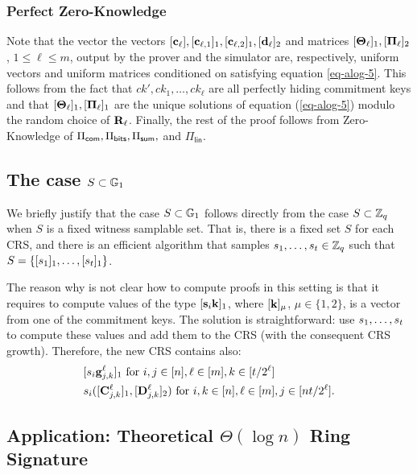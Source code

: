 \subsubsection{Perfect Zero-Knowledge}
Note that the vector the vectors \([\mathbf{c}_\ell],[\mathbf{c}_{\ell,1}]_1,[\mathbf{c}_{\ell,2}]_1,[\mathbf{d}_\ell]_2\) and matrices \([\mathbf{{\Theta}}_\ell]_1,[\mathbf{{\Pi}}_\ell]_2\), \(1\leq\ell\leq m\), output by the prover and the simulator are, respectively, uniform vectors and uniform matrices conditioned on satisfying equation \ref{eq-alog-5}. This follows from the fact that \(ck',ck_1,\ldots,ck_\ell\) are all perfectly hiding commitment keys and that \([\mathbf{{\Theta}}_\ell]_1,[\mathbf{{\Pi}}_\ell]_1\) are the unique solutions of equation (\ref{eq-alog-5}) modulo the random choice of \(\mathbf{{R}}_\ell\). Finally, the rest of the proof follows from Zero-Knowledge of \(\Pi_{\mathsf{com}},\Pi_{\mathsf{bits}},\Pi_{\mathsf{sum}},\) and \(\Pi_\mathsf{lin}\).

\subsection{The case \(S\subset\mathbb{G}_1\)} \label{sec:improved-aZKSMP-group-case}
We briefly justify that the case \(S\subset\mathbb{G}_1\) follows directly from the case \(S\subset\mathbb{Z}_q\) when \(S\) is a fixed witness samplable set. That is, there is a fixed set $S$ for each CRS, and there is an efficient algorithm that samples \(s_1,\ldots,s_{t }\in\mathbb{Z}_q\) such that \(S=\{[s_1]_1,\ldots,[s_{t }]_1\}\). %

The reason why is not clear how to compute proofs in this setting is that it requires to compute values of the type \([\mathbf{s}_i\mathbf{k}]_1\), where \([\mathbf{k}]_\mu\), \(\mu\in\{1,2\}\), is a vector from one of the commitment keys. The solution is straightforward: use \(s_1,\ldots,s_{t }\) to compute these values and add them to the CRS (with the consequent CRS growth). Therefore, the new CRS contains also:
\begin{align*}
&[s_i\mathbf{g}_{j,k}^\ell]_1 \text{ for } i,j\in [n], \ell\in [m], k\in[t /2^\ell]\\
& s_i([\mathbf{{C}}^\ell_{j,k}]_1,[\mathbf{{D}}_{j,k}^\ell]_2) \text{ for } i,k\in [n], \ell\in [m], j\in [nt /2^\ell].
\end{align*}

\subsection{Application: Theoretical \(\Theta(\log n)\) Ring Signature} \label{sec:log-ring-signature}

